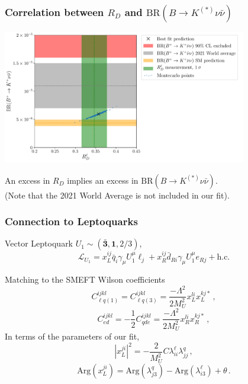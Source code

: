 \documentclass[mathserif, 10pt]{beamer}
\begin{document}
\begin{frame}
    \frametitle{Correlation between $R_D$ and $\mathrm{BR}(B\to K^{(*)}\nu\bar{\nu})$}

    \begin{center}
        \includegraphics[width=0.8\textwidth]{figures/RD_BKnunu.pdf}
    \end{center}

    An excess in $R_D$ implies an excess in $\mathrm{BR}(B\to K^{(*)}\nu\bar{\nu})$. \\(Note that the {\color{gray}2021 World Average} is not included in our fit).

\end{frame}


\begin{frame}
    \frametitle{Connection to Leptoquarks}

    Vector Leptoquark $U_1 \sim (\bar{\mathbf{3}}, \mathbf{1}, 2/3)$,
    $$\mathcal{L}_{U_1} = x_L^{ij} \bar{q}_i \gamma_\mu U_1^\mu \ell_j + x_R^{ij} \bar{d}_{Ri} \gamma_\mu U_1^\mu e_{Rj} + \mathrm{h.c.} $$

    Matching to the SMEFT Wilson coefficients
    $$C_{\ell q(1)}^{ijkl} = C_{\ell q(3)}^{ijkl} = \frac{-\Lambda^2}{2M_U^2}x_L^{li}x_L^{kj*}\,,$$
    $$C_{ed}^{ijkl} = -\frac{1}{2}C_{qde}^{ijkl} = \frac{-\Lambda^2}{2M_U^2}x_R^{li}x_R^{kj*}\,,$$
    In terms of the parameters of our fit,
    $$|x_L^{ji}|^2 = -\frac{2}{M_U^2}C\lambda^\ell_{ii}\lambda^q_{jj}\,,$$
    $$\mathrm{Arg}(x_L^{ji}) = \mathrm{Arg}(\lambda_{j3}^q)-\mathrm{Arg}(\lambda_{i3}^\ell) + \theta\,.$$ %

\end{frame}
\end{document}
